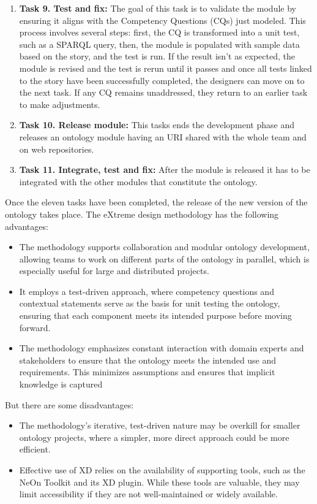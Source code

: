 \begin{enumerate}
    \item \textbf{Task 9. Test and fix:} The goal of this task is to validate the module by ensuring it aligns with the Competency Questions (CQs) just modeled. This process involves several steps: first, the CQ is transformed into a unit test, such as a SPARQL query, then, the module is populated with sample data based on the story, and the test is run. If the result isn't as expected, the module is revised and the test is rerun until it passes and once all tests linked to the story have been successfully completed, the designers can move on to the next task. If any CQ remains unaddressed, they return to an earlier task to make adjustments.

    \item \textbf{Task 10. Release module:} This tasks ends the development phase and releases an ontology module having an URI shared with the whole team and on web repositories.

    \item \textbf{Task 11. Integrate, test and fix:} After the module is released it has to be integrated with the other modules that constitute the ontology. 
\end{enumerate}
Once the eleven tasks have been completed, the release of the new version of the ontology takes place. 
The eXtreme design methodology has the following advantages:
\begin{itemize}
    \item The methodology supports collaboration and modular ontology development, allowing teams to work on different parts of the ontology in parallel, which is especially useful for large and distributed projects.

    \item It employs a test-driven approach, where competency questions and contextual statements serve as the basis for unit testing the ontology, ensuring that each component meets its intended purpose before moving forward.

    \item The methodology emphasizes constant interaction with domain experts and stakeholders to ensure that the ontology meets the intended use and requirements. This minimizes assumptions and ensures that implicit knowledge is captured
\end{itemize}
But there are some disadvantages:
\begin{itemize}
    \item The methodology's iterative, test-driven nature may be overkill for smaller ontology projects, where a simpler, more direct approach could be more efficient.

    \item Effective use of XD relies on the availability of supporting tools, such as the NeOn Toolkit and its XD plugin. While these tools are valuable, they may limit accessibility if they are not well-maintained or widely available.
\end{itemize}

